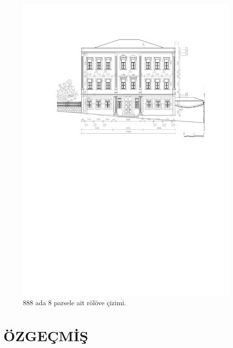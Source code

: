 \begin{figure}
\centering
\includegraphics[width=1\textwidth,height=\textheight]{source/figures/Roloveler/R888-8.pdf}
\caption{888 ada 8 parsele ait rölöve çizimi.}
\end{figure}

\newpage

\chapter*{ÖZGEÇMİŞ}\thispagestyle{empty}

